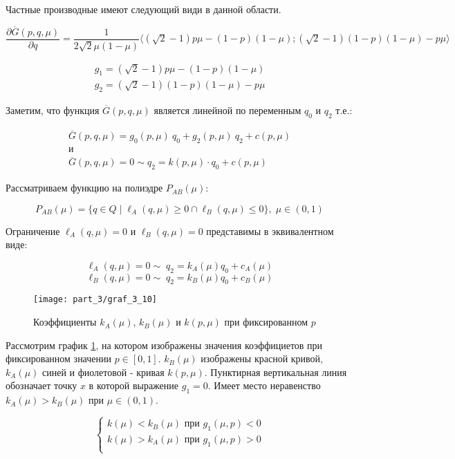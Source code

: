 \begin{flushleft}
	Частные производные имеют следующий види в данной области.
	
	$
	\dfrac{\partial \overline{G}(p,q,\mu)}{\partial q}=
	\dfrac{1}{2\sqrt{2}\mu(1-\mu)}
	\big \langle 
		(\sqrt{2} - 1)p\mu -(1-p)(1-\mu);
		(\sqrt{2} - 1)(1-p)(1-\mu) - p\mu			
	\big \rangle
	$

	\begin{gather*}
	g_1=(\sqrt{2} - 1)p\mu -(1-p)(1-\mu) \\
	g_2=(\sqrt{2} - 1)(1-p)(1-\mu) - p\mu
	\end{gather*}

 	Заметим, что функция $\overline{G}(p,q,\mu)$
 	является линейной по переменным $q_0$ и $q_2$ т.е.:

	\begin{gather*}
	\overline{G}(p,q,\mu)=g_0(p,\mu) \: q_0+g_2(p,\mu) \: q_2+c(p,\mu)
	\\
	\textrm{и}
	\\
	\overline{G}(p,q,\mu) = 0 \sim q_2 = k(p, \mu) \cdot q_0 + c(p, \mu)	
	\end{gather*}
	
	Рассматриваем функцию на полиэдре $P_{AB}(\mu):$
	
	$$P_{AB}(\mu)=
	\{
		q \in Q \; | \;  
		\ell_A(q, \mu) \geqslant 0 \cap
	 	\ell_B(q, \mu) \leqslant 0
	\},\; \mu \in (0,1) $$

	Ограничение $\ell_A(q, \mu) = 0$ и $\ell_B(q, \mu) = 0$ представимы в 
	эквивалентном виде:
	
	$$\ell_A(q,\mu)=0 \sim \; q_2=k_A(\mu)q_0+c_A(\mu)$$
	$$\ell_B(q,\mu)=0 \sim \; q_2=k_B(\mu)q_0+c_B(\mu)$$

	
	\begin{figure}[H]
		\centering
  		\texttt{[image: part\_3/graf\_3\_10]}
  		\caption{Коэффициенты $k_A(\mu)$, $k_B(\mu)$ и $k(p,\mu)$ при фиксированном $p$}
		\label{fig:k_A,k_B,k}	
	\end{figure}	
	
	Рассмотрим график \ref{fig:k_A,k_B,k}, на котором изображены значения коэффициетов
	при фиксированном значении $p \in [0,1]$. $k_B(\mu)$ изображены красной кривой,
	$k_A(\mu)$ синей и фиолетовой - кривая $k(p, \mu)$. Пунктирная вертикальная линия
	обозначает точку $x$ в которой выражение $g_1=0$. Имеет место неравенство 
	$k_A(\mu) > k_B(\mu)$ при $\mu \in (0,1)$.
	
	$$
	\begin{cases}
	k(\mu) < k_B(\mu) \textrm{ при } g_1(\mu,p) < 0  \\
	k(\mu) > k_A(\mu) \textrm{ при } g_1(\mu,p) > 0 \\
	\end{cases}		
	$$	
	

\end{flushleft}
